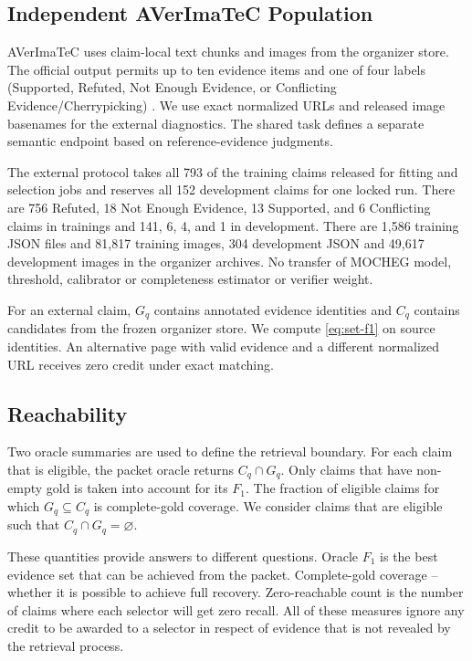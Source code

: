 

\subsection{Independent AVerImaTeC Population}

AVerImaTeC uses claim-local text chunks and images from the organizer store. The official output permits up to ten evidence items and one of four labels (Supported, Refuted, Not Enough Evidence, or Conflicting Evidence/Cherrypicking) \cite{cao2026averimatecshared}. We use exact normalized URLs and released image basenames for the external diagnostics. The shared task defines a separate semantic endpoint based on reference-evidence judgments.

The external protocol takes all 793 of the training claims released for fitting and selection jobs and reserves all 152 development claims for one locked run. There are 756 Refuted, 18 Not Enough Evidence, 13 Supported, and 6 Conflicting claims in trainings and 141, 6, 4, and 1 in development. There are 1,586 training JSON files and 81,817 training images, 304 development JSON and 49,617 development images in the organizer archives. No transfer of MOCHEG model, threshold, calibrator or completeness estimator or verifier weight.

For an external claim, $G_q$ contains annotated evidence identities and $C_q$ contains candidates from the frozen organizer store. We compute \eqref{eq:set-f1} on source identities. An alternative page with valid evidence and a different normalized URL receives zero credit under exact matching.

\subsection{Reachability}

Two oracle summaries are used to define the retrieval boundary. For each claim that is eligible, the packet oracle returns $C_q \cap G_q$. Only claims that have non-empty gold is taken into account for its $F_1$. The fraction of eligible claims for which $G_q \subseteq C_q$ is complete-gold coverage. We consider claims that are eligible such that $C_q \cap G_q= \varnothing$.

These quantities provide answers to different questions. Oracle $F_1$ is the best evidence set that can be achieved from the packet. Complete-gold coverage -- whether it is possible to achieve full recovery. Zero-reachable count is the number of claims where each selector will get zero recall. All of these measures ignore any credit to be awarded to a selector in respect of evidence that is not revealed by the retrieval process.

